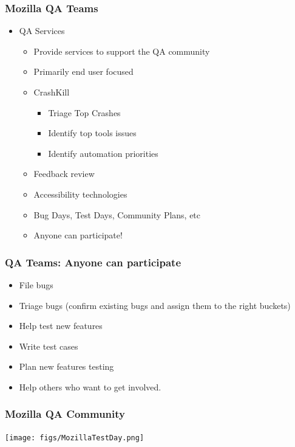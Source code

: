 \documentclass{beamer}
\begin{document}
\begin{frame}
\frametitle{Mozilla QA Teams}
 \begin{itemize}
 \item QA Services
      \begin{itemize}
      \item Provide services to support the QA community
      \item Primarily end user focused
      \item CrashKill
         \begin{itemize}
         \item Triage Top Crashes
         \item Identify top tools issues
         \item Identify automation priorities
         \end{itemize}
      \item Feedback review
      \item Accessibility technologies
      \item Bug Days, Test Days, Community Plans, etc
      \item Anyone can participate!
      \end{itemize}
 \end{itemize}

\end{frame}


\begin{frame}
\frametitle{QA Teams: Anyone can participate}
 \begin{itemize}
    \item File bugs
    \item Triage bugs (confirm existing bugs and assign them to the right buckets)
    \item Help test new features
    \item Write test cases
    \item Plan new features testing
    \item Help others who want to get involved. 
 \end{itemize}
\end{frame}


\begin{frame}
\frametitle{Mozilla QA Community}
\begin{center}
 \texttt{[image: figs/MozillaTestDay.png]}
\begin{figure}
\end{figure}
\end{center}
\end{frame}
\end{document}
